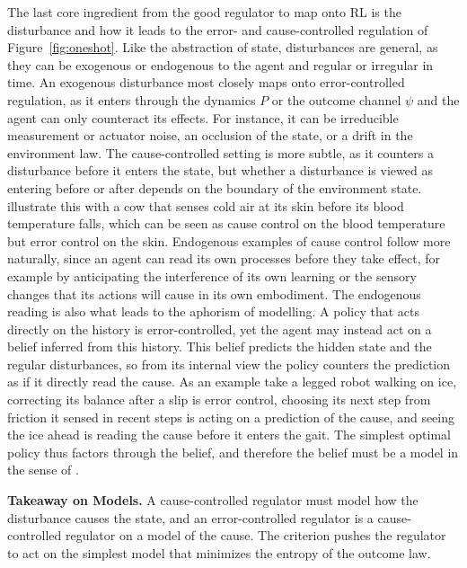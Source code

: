 The last core ingredient from the good regulator to map onto RL is the disturbance and how it leads to the error- and cause-controlled regulation of Figure~\ref{fig:oneshot}.
Like the abstraction of state, disturbances are general, as they can be exogenous or endogenous to the agent and regular or irregular in time.
An exogenous disturbance most closely maps onto error-controlled regulation, as it enters through the dynamics $P$ or the outcome channel $\psi$ and the agent can only counteract its effects.
For instance, it can be irreducible measurement or actuator noise, an occlusion of the state, or a drift in the environment law.
The cause-controlled setting is more subtle, as it counters a disturbance before it enters the state, but whether a disturbance is viewed as entering before or after depends on the boundary of the environment state.
\citet[p.~92]{Conant-good70} illustrate this with a cow that senses cold air at its skin before its blood temperature falls, which can be seen as cause control on the blood temperature but error control on the skin.
Endogenous examples of cause control follow more naturally, since an agent can read its own processes before they take effect, for example by anticipating the interference of its own learning or the sensory changes that its actions will cause in its own embodiment.
The endogenous reading is also what leads to the aphorism of modelling.
A policy that acts directly on the history is error-controlled, yet the agent may instead act on a belief inferred from this history.
This belief predicts the hidden state and the regular disturbances, so from its internal view the policy counters the prediction as if it directly read the cause.
As an example take a legged robot walking on ice, correcting its balance after a slip is error control, choosing its next step from friction it sensed in recent steps is acting on a prediction of the cause, and seeing the ice ahead is reading the cause before it enters the gait.
The simplest optimal policy thus factors through the belief, and therefore the belief must be a model in the sense of \citet{Conant-good70}.

\begin{tcolorbox}[colback=gray!4, colframe=gray!60, boxrule=0.5pt, arc=2pt, left=6pt, right=6pt, top=4pt, bottom=4pt]
\small
\textbf{Takeaway on Models.}
A cause-controlled regulator must model how the disturbance causes the state, and an error-controlled regulator is a cause-controlled regulator on a model of the cause.
The criterion pushes the regulator to act on the simplest model that minimizes the entropy of the outcome law.
\end{tcolorbox}


